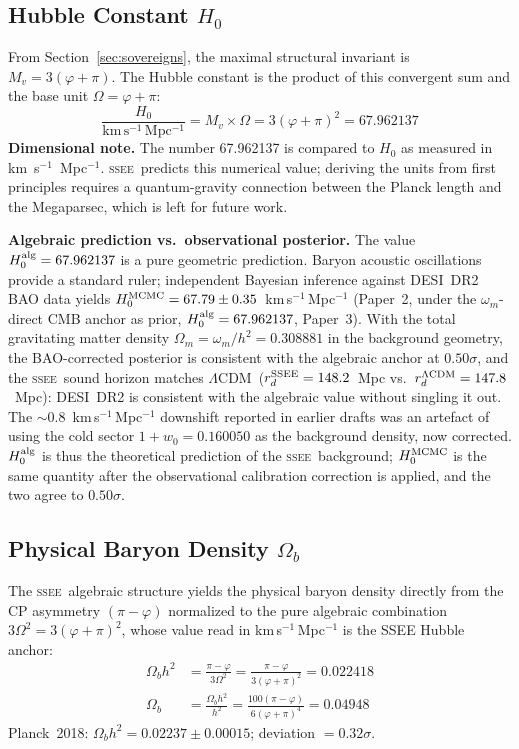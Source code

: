 \documentclass[12pt,a4paper]{article}
\newcommand{\SSEE}{\ifmmode\mathrm{SSEE}\else\textsc{ssee}\fi}
\newcommand{\LCDM}{\ifmmode\Lambda\mathrm{CDM}\else$\Lambda$CDM\fi}
\begin{document}
\subsection{Hubble Constant \texorpdfstring{$H_0$}{H0}}
\label{sec:h0}

From Section~\ref{sec:sovereigns}, the maximal structural invariant is $M_v = 3(\varphi+\pi)$.
The Hubble constant is the product of this convergent sum and the base unit
$\Omega = \varphi+\pi$:
\begin{equation}
\boxed{\frac{H_0}{\mathrm{km\,s^{-1}\,Mpc^{-1}}} = M_v \times \Omega = 3(\varphi+\pi)^2 = 67.962137}
\label{eq:H0}
\end{equation}
\textbf{Dimensional note.} The number 67.962137 is compared to $H_0$ as measured
in km~s$^{-1}$~Mpc$^{-1}$.  \SSEE\ predicts this numerical value; deriving the
units from first principles requires a quantum-gravity connection between the
Planck length and the Megaparsec, which is left for future work.

\textbf{Algebraic prediction vs.\ observational posterior.}
The value $H_0^{\rm alg}=67.962137$ is a pure geometric prediction.
Baryon acoustic oscillations \citep{Eisenstein2005} provide a standard ruler;
independent Bayesian inference against DESI~DR2 BAO data \citep{desidr2_2025} yields
$H_0^{\rm MCMC}=67.79\pm0.35$~km\,s$^{-1}$\,Mpc$^{-1}$ (Paper~2, under
the $\omega_m$-direct CMB anchor as prior, $H_0^{\rm alg}=67.962137$, Paper~3).
With the total gravitating matter density $\Omega_m=\omega_m/h^2=0.308881$ in the
background geometry, the BAO-corrected posterior is consistent with the algebraic
anchor at $0.50\sigma$, and the \SSEE\ sound horizon matches \LCDM\
($r_d^{\rm SSEE}=148.2$~Mpc vs.\ $r_d^{\rm \Lambda CDM}=147.8$~Mpc): DESI~DR2
is consistent with the algebraic value without singling it out. The $\sim$0.8~km\,s$^{-1}$\,Mpc$^{-1}$ downshift
reported in earlier drafts was an artefact of using the cold sector
$1+w_0=0.160050$ as the background density, now corrected.
$H_0^{\rm alg}$ is thus the theoretical prediction of the \SSEE\ background;
$H_0^{\rm MCMC}$ is the same quantity after the observational calibration
correction is applied, and the two agree to $0.50\sigma$.

\subsection{Physical Baryon Density \texorpdfstring{$\Omega_b$}{Omega\_b}}
\label{sec:baryons}

The \SSEE\ algebraic structure yields the physical baryon density directly from
the CP asymmetry $(\pi-\varphi)$ normalized to the pure algebraic combination
$3\Omega^2 = 3(\varphi+\pi)^2$, whose value read in km\,s$^{-1}$\,Mpc$^{-1}$ is
the SSEE Hubble anchor:
\begin{align}
\Omega_b h^2 &= \frac{\pi-\varphi}{3\Omega^2} = \frac{\pi-\varphi}{3(\varphi+\pi)^2} = 0.022418
\label{eq:Obh2} \\[4pt]
\Omega_b     &= \frac{\Omega_b h^2}{h^2}
              = \frac{100(\pi-\varphi)}{6(\varphi+\pi)^4}
              = 0.04948
\label{eq:Ob}
\end{align}
Planck~2018: $\Omega_b h^2 = 0.02237\pm0.00015$; deviation $= 0.32\sigma$.
\end{document}
